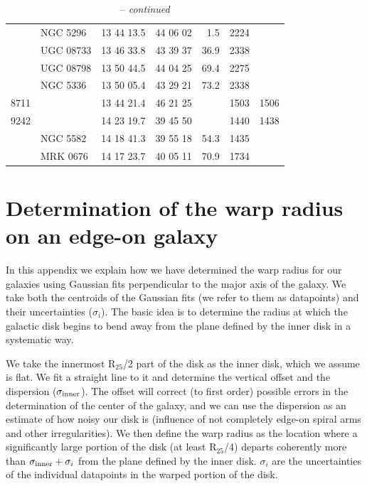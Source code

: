 \documentclass{aa}
\newcounter{dummyfofo}
\begin{document}
\begin{center}
\begin{table}
\begin{center}
\begin{tabular}{|c|l|c|c|r|r|r|}
      & NGC 5296                 & 13 44 13.5 & 44 06 02   &   1.5  &   2224 &       \\
      & UGC 08733                & 13 46 33.8 & 43 39 37   &   36.9 &   2338 &       \\
      & UGC 08798                & 13 50 44.5 & 44 04 25   &   69.4 &   2275 &       \\
      & NGC 5336                 & 13 50 05.4 & 43 29 21   &   73.2 &   2338 &       \\
\hline
8711  &                          & 13 44 21.4 & 46 21 25   &        &   1503 &   1506\\
\hline
9242  &                          & 14 23 19.7 & 39 45 50   &        &   1440 &   1438\\
      & NGC 5582                 & 14 18 41.3 & 39 55 18   &   54.3 &   1435 &       \\
      & MRK 0676                 & 14 17 23.7 & 40 05 11   &   70.9 &   1734 &       \\
\hline
\end{tabular}
\caption{ -- {\it continued}}
\end{center}
\end{table}
\end{center}

\setcounter{dummyfofo}{\thefigure}
\appendix
\section{Determination of the warp radius on an edge-on galaxy}
\label{rwarp}

In this appendix we explain how we have determined the warp radius for our
galaxies using Gaussian fits perpendicular to the
major axis of the galaxy. We take both the centroids of the Gaussian
fits (we refer to them as datapoints) and their uncertainties ($\sigma_i$). 
The basic idea is to determine the radius at which the
galactic disk begins to bend away from the plane defined by the inner
disk in a systematic way. 

We take the innermost R$_{25}$/2 part of the disk as the inner disk,
which we assume is flat. We fit a straight line to it and determine
the vertical offset and the dispersion ($\sigma_{\rm inner}$). The
offset will correct (to first order) possible errors in the
determination of the center of the galaxy, and we can use the
dispersion as an estimate of how noisy our disk is (influence of not
completely edge-on spiral arms and other irregularities).  We then
define the warp radius as the location where a significantly large
portion of the disk (at least R$_{25}$/4) departs coherently more than
$\sigma_{\rm inner}+\sigma_i$ from the plane defined by the inner
disk. $\sigma_i$ are the uncertainties of the individual datapoints in
the warped portion of the disk.
\end{document}
